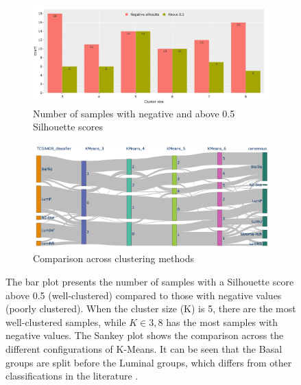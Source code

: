 \begin{figure}[H]
    \centering
    \captionsetup{font=small} 
    \begin{subfigure}[!t]{0.88\textwidth}
        \includegraphics[width=\textwidth, keepaspectratio]{Sections/ClusteringAnalysis/Resources/cs_top3/sill_distrib/sill_neg_above_th.png}
        \caption{Number of samples with negative and above 0.5 Silhouette scores}
        \label{fig:cs:sill_neg_above_th}
    \end{subfigure}
    \centering
     \begin{subfigure}[!t]{0.88\textwidth}
        \includegraphics[width=\textwidth, keepaspectratio]{Sections/ClusteringAnalysis/Resources/cs_top3/sill_distrib/sky_kMeans.png}
        \caption{Comparison across clustering methods}
        \label{fig:cs:sankey_kMeans}
    \end{subfigure}
    \centering
    \caption{The bar plot presents the number of samples with a Silhouette score above 0.5 (well-clustered) compared to those with negative values (poorly clustered). When the cluster size (K) is 5, there are the most well-clustered samples, while $K\in{3,8}$ has the most samples with negative values. The Sankey plot shows the comparison across the different configurations of K-Means. It can be seen that the Basal groups are split before the Luminal groups, which differs from other classifications in the literature \citep{Robertson2017-mg, Kamoun2020-tj}.}
    \label{fig:cs:sankey_comp}
\end{figure}



